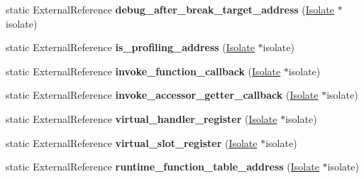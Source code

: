 \begin{DoxyCompactItemize}
\item 
static External\+Reference {\bfseries debug\+\_\+after\+\_\+break\+\_\+target\+\_\+address} (\hyperlink{classv8_1_1internal_1_1_isolate}{Isolate} $\ast$isolate)\hypertarget{classv8_1_1internal_1_1_b_a_s_e___e_m_b_e_d_d_e_d_a175f58d3320a883b648f0637b187de41}{}\label{classv8_1_1internal_1_1_b_a_s_e___e_m_b_e_d_d_e_d_a175f58d3320a883b648f0637b187de41}

\item 
static External\+Reference {\bfseries is\+\_\+profiling\+\_\+address} (\hyperlink{classv8_1_1internal_1_1_isolate}{Isolate} $\ast$isolate)\hypertarget{classv8_1_1internal_1_1_b_a_s_e___e_m_b_e_d_d_e_d_a6edfe88146989aaaf922acf9dbceaf87}{}\label{classv8_1_1internal_1_1_b_a_s_e___e_m_b_e_d_d_e_d_a6edfe88146989aaaf922acf9dbceaf87}

\item 
static External\+Reference {\bfseries invoke\+\_\+function\+\_\+callback} (\hyperlink{classv8_1_1internal_1_1_isolate}{Isolate} $\ast$isolate)\hypertarget{classv8_1_1internal_1_1_b_a_s_e___e_m_b_e_d_d_e_d_a13e814a8d53766c4dd6c9e4ee145b672}{}\label{classv8_1_1internal_1_1_b_a_s_e___e_m_b_e_d_d_e_d_a13e814a8d53766c4dd6c9e4ee145b672}

\item 
static External\+Reference {\bfseries invoke\+\_\+accessor\+\_\+getter\+\_\+callback} (\hyperlink{classv8_1_1internal_1_1_isolate}{Isolate} $\ast$isolate)\hypertarget{classv8_1_1internal_1_1_b_a_s_e___e_m_b_e_d_d_e_d_aa2021533a4a2aa6baaa21589ea4b37f9}{}\label{classv8_1_1internal_1_1_b_a_s_e___e_m_b_e_d_d_e_d_aa2021533a4a2aa6baaa21589ea4b37f9}

\item 
static External\+Reference {\bfseries virtual\+\_\+handler\+\_\+register} (\hyperlink{classv8_1_1internal_1_1_isolate}{Isolate} $\ast$isolate)\hypertarget{classv8_1_1internal_1_1_b_a_s_e___e_m_b_e_d_d_e_d_a3a237b4fe2ebe025f4c9020fd9841fae}{}\label{classv8_1_1internal_1_1_b_a_s_e___e_m_b_e_d_d_e_d_a3a237b4fe2ebe025f4c9020fd9841fae}

\item 
static External\+Reference {\bfseries virtual\+\_\+slot\+\_\+register} (\hyperlink{classv8_1_1internal_1_1_isolate}{Isolate} $\ast$isolate)\hypertarget{classv8_1_1internal_1_1_b_a_s_e___e_m_b_e_d_d_e_d_a888fe8086a74685b7ddd1abe7404036c}{}\label{classv8_1_1internal_1_1_b_a_s_e___e_m_b_e_d_d_e_d_a888fe8086a74685b7ddd1abe7404036c}

\item 
static External\+Reference {\bfseries runtime\+\_\+function\+\_\+table\+\_\+address} (\hyperlink{classv8_1_1internal_1_1_isolate}{Isolate} $\ast$isolate)\hypertarget{classv8_1_1internal_1_1_b_a_s_e___e_m_b_e_d_d_e_d_a15b69b88736fb3a9b95883794165f42e}{}\label{classv8_1_1internal_1_1_b_a_s_e___e_m_b_e_d_d_e_d_a15b69b88736fb3a9b95883794165f42e}


\end{DoxyCompactItemize}
